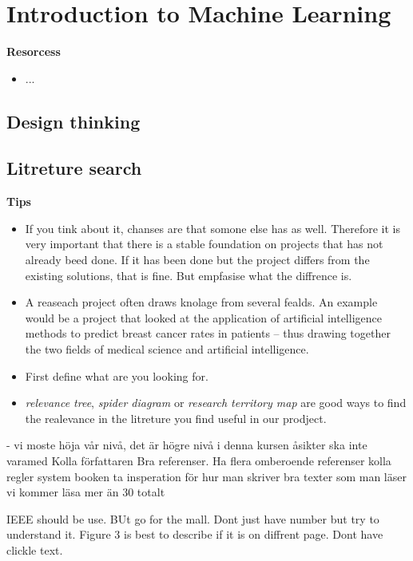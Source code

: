 \chapter{Introduction to Machine Learning}

\textbf{Resorcess}
\begin{itemize}
    \item ... 
\end{itemize}

\newpage

\section{Design thinking}

\section{Litreture search}
\textbf{Tips}
\begin{itemize}
\item If you tink about it, chanses are that somone else has as well. Therefore it is very important
  that there is a stable foundation on projects that has not already beed done. If it has been done
  but the project differs from the existing solutions, that is fine. But empfasise what the diffrence is.
\item A reaseach project often draws knolage from several fealds. An example would be a project
that looked at the application of artificial intelligence methods to predict breast cancer
rates in patients – thus drawing together the two fields of medical science and artificial
intelligence. 
\item First define what are you looking for.
\item \textit{relevance tree}, \textit{spider diagram} or \textit{research territory map} are good ways to find the realevance in the litreture you find useful in our prodject. 
\end{itemize}


- vi moste höja vår nivå, det är högre nivå i denna kursen
åsikter ska inte varamed
Kolla författaren
Bra referenser.
Ha flera omberoende referenser
kolla regler system booken
ta insperation för hur man skriver bra texter som man läser
vi kommer läsa mer än 30 totalt

IEEE should be use. BUt go for the mall. Dont just have number but try to understand it. Figure 3 is best to describe if it is on diffrent page. Dont have clickle text.

